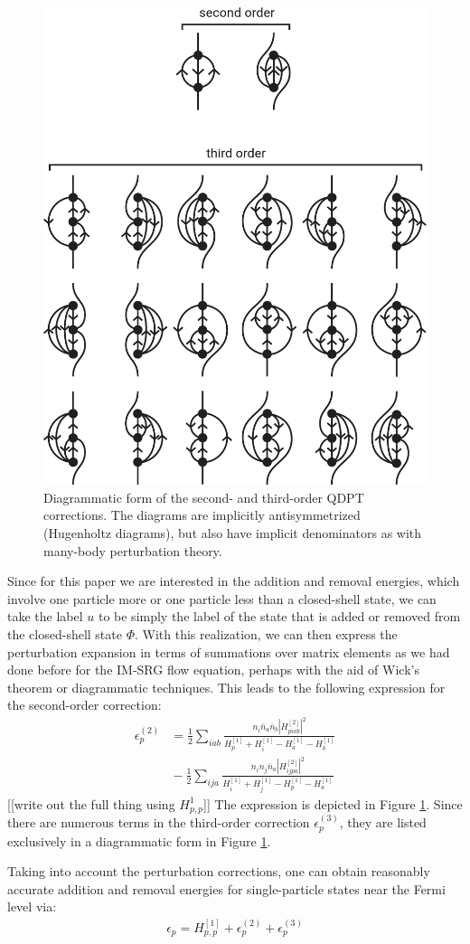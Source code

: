 \begin{figure}
\includegraphics[width=.48\textwidth]{fig-diagrams-sfe}
\caption{Diagrammatic form of the second- and third-order QDPT corrections.  The diagrams are implicitly antisymmetrized (Hugenholtz diagrams), but also have implicit denominators as with many-body perturbation theory.}
\label{fig:diagrams-sfe}
\end{figure}

Since for this paper we are interested in the addition and removal energies, which involve one particle more or one particle less than a closed-shell state, we can take the label $u$ to be simply the label of the state that is added or removed from the closed-shell state $\Phi$.  With this realization, we can then express the perturbation expansion in terms of summations over matrix elements as we had done before for the IM-SRG flow equation, perhaps with the aid of Wick's theorem or diagrammatic techniques.  This leads to the following expression for the second-order correction:
\begin{align*}
  \epsilon_p^{(2)}
  &=
  \frac{1}{2} \sum_{i a b} \frac{n_i \bar{n}_a \bar{n}_b |H^{[2]}_{p i a b}|^2}{H^{[1]}_p + H^{[1]}_i - H^{[1]}_a - H^{[1]}_b} \\
  &{}-
  \frac{1}{2} \sum_{i j a} \frac{n_i n_j \bar{n}_a |H^{[2]}_{i j p a}|^2}{H^{[1]}_i + H^{[1]}_j - H^{[1]}_p - H^{[1]}_a}
\end{align*}
[[write out the full thing using $H^1_{p,p}$]]
The expression is depicted in Figure \ref{fig:diagrams-sfe}.  Since there are numerous terms in the third-order correction $\epsilon_p^{(3)}$, they are listed exclusively in a diagrammatic form in Figure \ref{fig:diagrams-sfe}.

Taking into account the perturbation corrections, one can obtain reasonably accurate addition and removal energies for single-particle states near the Fermi level via:
\begin{align*}
  \epsilon_p = H^{[1]}_{p, p} + \epsilon_p^{(2)} + \epsilon_p^{(3)}
\end{align*}

